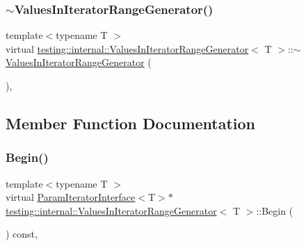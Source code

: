 \subsubsection{\texorpdfstring{$\sim$ValuesInIteratorRangeGenerator()}{~ValuesInIteratorRangeGenerator()}\hspace{0.1cm}{\footnotesize\ttfamily [3/3]}}
{\footnotesize\ttfamily template$<$typename T $>$ \\
virtual \mbox{\hyperlink{classtesting_1_1internal_1_1_values_in_iterator_range_generator}{testing\+::internal\+::\+Values\+In\+Iterator\+Range\+Generator}}$<$ T $>$\+::$\sim$\mbox{\hyperlink{classtesting_1_1internal_1_1_values_in_iterator_range_generator}{Values\+In\+Iterator\+Range\+Generator}} (\begin{DoxyParamCaption}{ }\end{DoxyParamCaption})\hspace{0.3cm}{\ttfamily [inline]}, {\ttfamily [virtual]}}



\subsection{Member Function Documentation}
\mbox{\label{classtesting_1_1internal_1_1_values_in_iterator_range_generator_a91dac42f069cd06d05348fe5dd78639b}} 
\subsubsection{\texorpdfstring{Begin()}{Begin()}\hspace{0.1cm}{\footnotesize\ttfamily [1/3]}}
{\footnotesize\ttfamily template$<$typename T $>$ \\
virtual \mbox{\hyperlink{classtesting_1_1internal_1_1_param_iterator_interface}{Param\+Iterator\+Interface}}$<$T$>$$\ast$ \mbox{\hyperlink{classtesting_1_1internal_1_1_values_in_iterator_range_generator}{testing\+::internal\+::\+Values\+In\+Iterator\+Range\+Generator}}$<$ T $>$\+::Begin (\begin{DoxyParamCaption}{ }\end{DoxyParamCaption}) const\hspace{0.3cm}{\ttfamily [inline]}, {\ttfamily [virtual]}}



